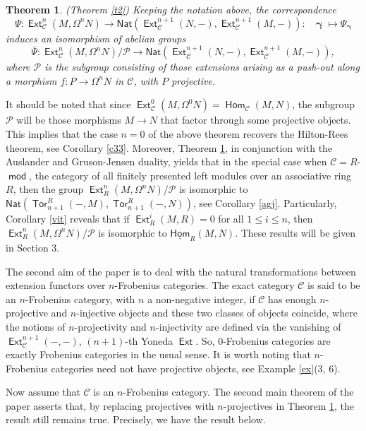 \documentclass[11pt,a4paper]{amsart}
\newcommand{\rt}{\rightarrow}
\newcommand{\lrt}{\longrightarrow}
\newcommand{\C}{\mathscr{C} }
\newcommand{\p}{\mathfrak{p} }
\def\Ext{\operatorname{{\mathsf{Ext}}}}
\def\hom{\operatorname{{\mathsf{Hom}}}}
\def\uhom{\operatorname{\underline{\mathsf{Hom}}}}
\def\Tor{\operatorname{\mathsf{Tor}}}
\def\hom{\operatorname{\mathsf{Hom}}}
\def\md{\operatorname{\mathsf{mod}}}
\def\syz{\mathsf{\Omega}}
\def\p{\mathcal P}
\def\ga{\operatorname{\boldsymbol{\gamma}}}
\newcommand{\nat}{{\mathsf{Nat}}}
\newtheorem{theorem}{Theorem}[section]
\theoremstyle{definition}
\theoremstyle{plain}
\theoremstyle{definition}
\numberwithin{equation}{section}
\begin{document}
\begin{theorem}\label{main1}(Theorem \ref{t2}) Keeping the notation above, the correspondence
$$\Psi:\Ext^n_{\C}(M, \syz^nN)\lrt\nat(\Ext^{n+1}_{\C}(N, -), \Ext^{n+1}_{\C}(M, -)):~~~\ga\mapsto\Psi_{\ga}$$
induces an isomorphism of abelian groups
$$\bar{\Psi}:\Ext^n_{\C}(M, \syz^nN)/{\p}\lrt\nat(\Ext^{n+1}_{\C}(N, -), \Ext^{n+1}_{\C}(M, -)),$$
where $\p$ is the subgroup consisting of those extensions arising as a push-out along a morphism $f: P\rt \syz^nN$ in $\C$, with $P$ projective.
\end{theorem}
It should be noted that  since $\Ext^0_{\C}(M, \syz^0N)=\hom_{\C}(M, N)$, the subgroup $\p$ will be those morphisms $M\rt N$ that factor through some projective objects. This  implies that the case $n=0$ of the above theorem recovers the Hilton-Rees theorem, see Corollary \ref{c33}. Moreover, Theorem \ref{main1}, in conjunction with the Auslander \cite{aus1} and Gruson-Jensen \cite{gj} duality, yields that in the special case when $\C=R$-$\md$, the category of all finitely presented left modules over an associative ring $R$, then the group $\Ext^n_R(M, \syz^nN)/{\p}$ is isomorphic to $\nat(\Tor_{n+1}^R(-, M), \Tor_{n+1}^R(-, N))$, see Corollary \ref{agj}. Particularly, Corollary \ref{vit} reveals that if $\Ext^i_R(M, R)=0$ for all $1\leq i\leq n$, then $\Ext^n_{R}(M, \syz^nN)/{\p}$ is isomorphic to $\uhom_R(M, N)$. These results will be given in Section 3.

The second aim of the paper is to deal with the natural transformations between extension functors over $n$-Frobenius categories. The exact category $\C$ is said to be an $n$-Frobenius category, with $n$ a non-negative integer, if  $\C$ has enough $n$-projective and $n$-injective objects and these two classes of objects coincide, where the notions of $n$-projectivity and $n$-injectivity are defined via the vanishing of $\Ext^{n+1}_{\C}(-, -)$, $(n+1)$-th Yoneda $\Ext$. So, 0-Frobenius categories are exactly Frobenius categories in the usual sense. It is worth noting that $n$-Frobenius categories need not have projective objects, see Example \ref{ex}(3, 6).

Now assume that $\C$ is an $n$-Frobenius category. The second main theorem of the paper asserts that, by replacing projectives with $n$-projectives in Theorem \ref{main1}, the result still remains true. Precisely, we have the result below.
\end{document}
